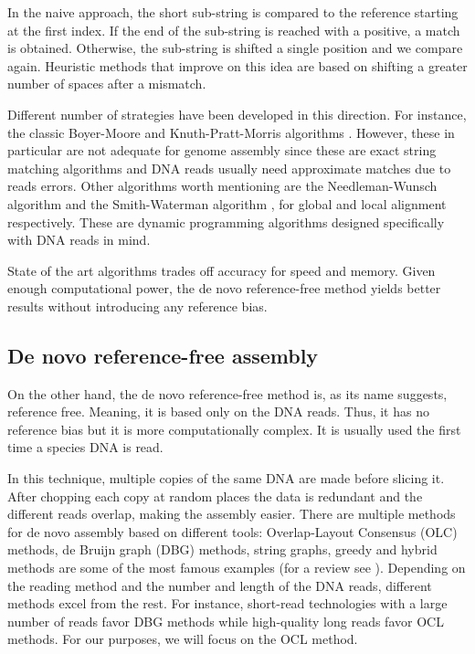 In the naive approach, the short sub-string is compared to the reference starting at the first index. If the end of the sub-string is reached with a positive, a match is obtained. Otherwise, the sub-string is shifted a single position and we compare again. Heuristic methods that improve on this idea are based on shifting a greater number of spaces after a mismatch.

Different number of strategies have been developed in this direction. For instance, the classic Boyer-Moore and Knuth-Pratt-Morris algorithms \cite{Holmes1999}. However, these in particular are not adequate for genome assembly since these are exact string matching algorithms and DNA reads usually need approximate matches due to reads errors. Other algorithms worth mentioning are the Needleman-Wunsch algorithm \cite{Needleman1970} and the Smith-Waterman algorithm \cite{Smith1981}, for global and local alignment respectively. These are dynamic programming algorithms designed specifically with DNA reads in mind. 

State of the art algorithms trades off accuracy for speed and memory. Given enough computational power, the de novo reference-free method yields better results without introducing any reference bias.


\subsection{De novo reference-free assembly}
\label{sec:de-novo-genome-assembly}

On the other hand, the de novo reference-free method is, as its name suggests, reference free. Meaning, it is based only on the DNA reads. Thus, it has no reference bias but it is more computationally complex. It is usually used the first time a species DNA is read.

In this technique, multiple copies of the same DNA are made before slicing it. After chopping each copy at random places the data is redundant and the different reads overlap, making the assembly easier. There are multiple methods for de novo assembly based on different tools: Overlap-Layout Consensus (OLC) methods, de Bruijn graph (DBG) methods, string graphs, greedy and hybrid methods are some of the most famous examples (for a review see \cite{Sohn2018}). Depending on the reading method and the number and length of the DNA reads, different methods excel from the rest. For instance, short-read technologies with a large number of reads favor DBG methods while high-quality long reads favor OCL methods. For our purposes, we will focus on the OCL method.

